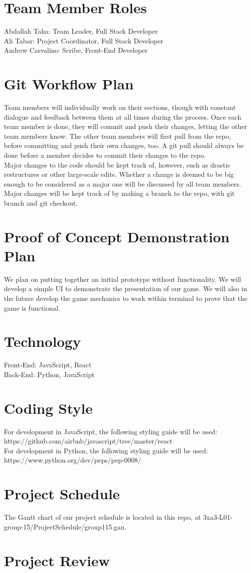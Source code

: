 \documentclass{article}
\begin{document}
\section{Team Member Roles}
Abdallah Taha: Team Leader, Full Stack Developer \\
Ali Tabar: Project Coordinator, Full Stack Developer \\
Andrew Carvalino: Scribe, Front-End Developer \\

\section{Git Workflow Plan}

Team members will individually work on their sections, though with constant dialogue and feedback between them at all times during the process. Once each team member is done, they will commit and push their changes, letting the other team members know. The other team members will first pull from the repo, before committing and push their own changes, too. A git pull should always be done before a member decides to commit their changes to the repo.\\
Major changes to the code should be kept track of, however, such as drastic restructures or other large-scale edits. Whether a change is deemed to be big enough to be considered as a major one will be discussed by all team members. Major changes will be kept track of by making a branch to the repo, with git branch and git checkout.


\section{Proof of Concept Demonstration Plan}
We plan on putting together an initial prototype without functionality. We will develop a simple UI to demonstrate the presentation of our game. We will also in the future develop the game mechanics to work within terminal to prove that the game is functional.

\section{Technology}
Front-End: JavaScript, React\\
Back-End: Python, JavaScript

\section{Coding Style}
For development in JavaScript, the following styling guide will be used:\\
https://github.com/airbnb/javascript/tree/master/react \\
For development in Python, the following styling guide will be used:\\ 
https://www.python.org/dev/peps/pep-0008/ \\

\section{Project Schedule}

The Gantt chart of our project schedule is located in this repo, at 3xa3-L01-group-15/ProjectSchedule/group115.gan.

\section{Project Review}
\end{document}
